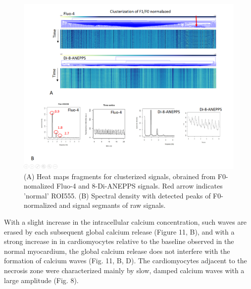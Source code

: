 \documentclass{biophys-new}
\begin{document}
\begin{figure}
    \includegraphics[width=0.9\linewidth]{fig6.png}
    \caption{(A) Heat maps fragments for clusterized signals, obrained from  F0-nomalized Fluo-4 and 8-Di-ANEPPS signals. Red arrow indicates 'normal' ROI555. (B) Spectral density with detected peaks of F0-normalized and signal segmants of raw signals.}
    \label{fig:fig6}
\end{figure}


 With a slight increase in the intracellular calcium concentration, such waves are erased by each subsequent global calcium release (Figure 11, B), and with a strong increase in  in cardiomyocytes relative to the baseline observed in the normal myocardium, the global calcium release does not interfere with the formation of calcium waves (Fig. 11, B, D).
 The cardiomyocytes adjacent to the necrosis zone were characterized mainly by slow, damped calcium waves with a large amplitude (Fig. 8).
\end{document}
